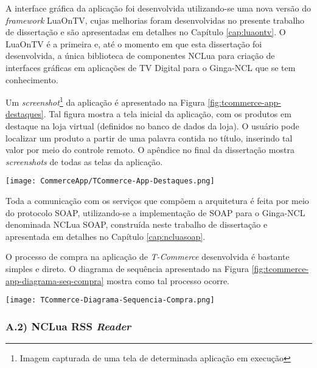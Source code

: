 A interface gráfica da aplicação foi desenvolvida
utilizando-se uma nova versão do \textit{framework} LuaOnTV\cite{junior2009luacomp}, cujas melhorias foram
desenvolvidas no presente trabalho de dissertação e são apresentadas em detalhes no Capítulo \ref{cap:luaontv}.
O LuaOnTV é a primeira e, até o momento em que esta dissertação foi desenvolvida,
a única biblioteca de componentes NCLua para criação de interfaces gráficas
em aplicações de TV Digital para o Ginga-NCL que se tem conhecimento.

Um \textit{screenshot}\footnote{Imagem capturada de uma tela de determinada aplicação em execução} da aplicação é apresentado na Figura \ref{fig:tcommerce-app-destaques}.
Tal figura mostra a tela inicial da aplicação, com os produtos em destaque na loja virtual (definidos no banco de dados da loja).
O usuário pode localizar um produto a partir de uma palavra contida no título,
inserindo tal valor por meio do controle remoto. 
O apêndice no final da dissertação mostra \textit{screenshots} de todas as telas da aplicação.

\begin{center}
	\texttt{[image: CommerceApp/TCommerce-App-Destaques.png]}
	\label{fig:tcommerce-app-destaques}
\end{center}

Toda a comunicação com os serviços que compõem a arquitetura é feita por meio do protocolo SOAP,
utilizando-se a implementação de SOAP para o Ginga-NCL denominada NCLua SOAP, construída
neste trabalho de dissertação e apresentada em detalhes no Capítulo \ref{cap:ncluasoap}. 

O processo de compra na aplicação de \textit{T-Commerce} desenvolvida é bastante simples e direto.
O diagrama de sequência apresentado na Figura \ref{fig:tcommerce-app-diagrama-seq-compra}
mostra como tal processo ocorre.

\begin{center}
	\texttt{[image: TCommerce-Diagrama-Sequencia-Compra.png]}
	\label{fig:tcommerce-app-diagrama-seq-compra}
\end{center}

\subsubsection*{A.2) NCLua RSS \textit{Reader}}

